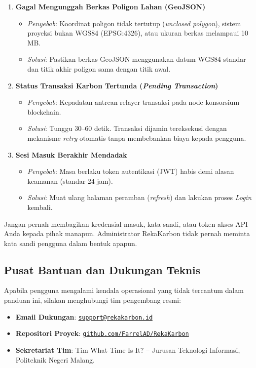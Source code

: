 \begin{enumerate}[label=\textbf{\arabic*.}]
    \item \textbf{Gagal Mengunggah Berkas Poligon Lahan (GeoJSON)}
    \begin{itemize}
        \item \textit{Penyebab}: Koordinat poligon tidak tertutup (\textit{unclosed polygon}), sistem proyeksi bukan WGS84 (EPSG:4326), atau ukuran berkas melampaui 10 MB.
        \item \textit{Solusi}: Pastikan berkas GeoJSON menggunakan datum WGS84 standar dan titik akhir poligon sama dengan titik awal.
    \end{itemize}

    \item \textbf{Status Transaksi Karbon Tertunda (\textit{Pending Transaction})}
    \begin{itemize}
        \item \textit{Penyebab}: Kepadatan antrean relayer transaksi pada node konsorsium blockchain.
        \item \textit{Solusi}: Tunggu 30--60 detik. Transaksi dijamin tereksekusi dengan mekanisme \textit{retry} otomatis tanpa membebankan biaya kepada pengguna.
    \end{itemize}

    \item \textbf{Sesi Masuk Berakhir Mendadak}
    \begin{itemize}
        \item \textit{Penyebab}: Masa berlaku token autentikasi (JWT) habis demi alasan keamanan (standar 24 jam).
        \item \textit{Solusi}: Muat ulang halaman peramban (\textit{refresh}) dan lakukan proses \textit{Login} kembali.
    \end{itemize}
\end{enumerate}

\begin{warningbox}
Jangan pernah membagikan kredensial masuk, kata sandi, atau token akses API Anda kepada pihak manapun. Administrator RekaKarbon tidak pernah meminta kata sandi pengguna dalam bentuk apapun.
\end{warningbox}

\subsection{Pusat Bantuan dan Dukungan Teknis}
Apabila pengguna mengalami kendala operasional yang tidak tercantum dalam panduan ini, silakan menghubungi tim pengembang resmi:
\begin{itemize}
    \item \textbf{Email Dukungan}: \href{mailto:support@rekakarbon.id}{\texttt{support@rekakarbon.id}}
    \item \textbf{Repositori Proyek}: \href{https://github.com/FarrelAD/RekaKarbon}{\texttt{github.com/FarrelAD/RekaKarbon}}
    \item \textbf{Sekretariat Tim}: Tim What Time Is It? -- Jurusan Teknologi Informasi, Politeknik Negeri Malang.
\end{itemize}

